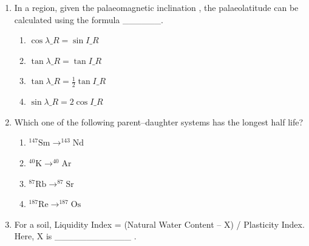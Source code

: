 \documentclass[journal,12pt,onecolumn]{IEEEtran}
\begin{document}
\begin{enumerate}
\begin{enumerate}
\hfill{}

\begin{multicols}{2}
\begin{enumerate}
\item P-1; Q-2; R-3; S-4
\item P-4; Q-3; R-1; S-2
\item P-3; Q-1; R-2; S-4
\item P-3; Q-4; R-2; S-1
\end{enumerate}
\end{multicols}

\item In a region, given the palaeomagnetic inclination , the palaeolatitude  can be calculated using the formula \_\_\_\_\_\_.

\hfill{}

\begin{multicols}{2}
\begin{enumerate}
\item $\cos \lambda\_R = \sin I\_R$
\item $\tan \lambda\_R = \tan I\_R$
\item $\tan \lambda\_R = \tfrac{1}{2}\tan I\_R$
\item $\sin \lambda\_R = 2\cos I\_R$
\end{enumerate}
\end{multicols}

\item Which one of the following parent–daughter systems has the longest half life?

\hfill{}

\begin{multicols}{2}
\begin{enumerate}
\item $^{147}\text{Sm} \rightarrow ^{143}\text{Nd}$
\item $^{40}\text{K} \rightarrow ^{40}\text{Ar}$
\item $^{87}\text{Rb} \rightarrow ^{87}\text{Sr}$
\item $^{187}\text{Re} \rightarrow ^{187}\text{Os}$
\end{enumerate}
\end{multicols}



\item For a soil, Liquidity Index = (Natural Water Content -- X) / Plasticity Index. Here, X is ____________ .


\end{enumerate}
\end{enumerate}
\end{document}
